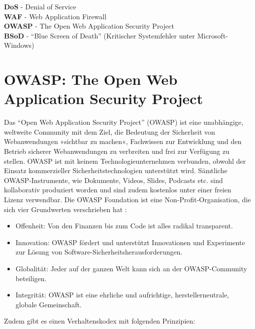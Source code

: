 \documentclass[12pt,oneside,a4paper,parskip]{scrbook}
\begin{document}
  \textbf{DoS} - Denial of Service\\

  \textbf{WAF} - Web Application Firewall\\

  \textbf{OWASP} - The Open Web Application Security Project\\

  \textbf{BSoD} - ``Blue Screen of Death'' (Kritischer Systemfehler unter Microsoft-Windows)\\
  \newpage

  \section{OWASP: The Open Web Application Security Project}
  Das ``Open Web Application Security Project'' (OWASP) ist eine unabhängige, weltweite Community mit dem Ziel, die Bedeutung der Sicherheit von Webanwendungen »sichtbar zu machen«, Fachwissen zur Entwicklung und den Betrieb sicherer Webanwendungen zu verbreiten und frei zur Verfügung zu stellen.
  OWASP ist mit keinem Technologieunternehmen verbunden, obwohl der Einsatz kommerzieller Sicherheitstechnologien unterstützt wird. Sämtliche OWASP-Instrumente, wie Dokumente, Videos, Slides, Podcasts etc. sind kollaborativ produziert worden und sind zudem kostenlos unter einer freien Lizenz verwendbar. Die OWASP Foundation ist eine Non-Profit-Organisation, die sich vier Grundwerten verschrieben hat \cite{OWASPabout}:
  \begin{itemize}
    \item Offenheit: Von den Finanzen bis zum Code ist alles radikal transparent.
    \item Innovation: OWASP fördert und unterstützt Innovationen und Experimente zur Lösung von Software-Sicherheitsherausforderungen.
    \item Globalität: Jeder auf der ganzen Welt kann sich an der OWASP-Community beteiligen.
    \item Integrität: OWASP ist eine ehrliche und aufrichtige, herstellerneutrale, globale Gemeinschaft.
  \end{itemize}
  Zudem gibt es einen Verhaltenskodex mit folgenden Prinzipien:
\end{document}

